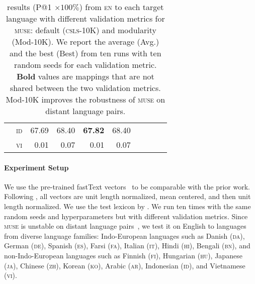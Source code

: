 \begin{table}[!tb]
\begin{tabular}{llrrrrrrrr}
                                 & \textsc{id} &  67.69          & 68.40                    & \bf 67.82    & 68.40     \\
                                 & \textsc{vi} &  0.01           & 0.07                     & 0.01         & 0.07      \\ \hline
     \end{tabular}
    \caption{\label{tab:validation_metric}  results (P@1
      $\times 100\%$) from \textsc{en} to each target language with
      different validation metrics for \textsc{muse}: default
      (\textsc{csls}-10K) and modularity (Mod-10K).  We report the
      average (Avg.) and the best (Best) from ten runs with ten random
      seeds for each validation metric.  \textbf{Bold} values are
      mappings that are not shared between the two validation metrics.
      Mod-10K improves the robustness of \textsc{muse} on distant
      language pairs.
      }
\end{table}



\paragraph{Experiment Setup}

We use the pre-trained
fastText vectors~\citep{fasttext} to be comparable with the prior
work.  Following \citet{self_learn}, all vectors are unit length
normalized, mean centered, and then unit length
normalized.
We use the test lexicon by \citet{lample2018word}.
We run ten times with the same random seeds and
hyperparameters but with different validation metrics.  Since
\textsc{muse} is unstable on distant language
pairs~\cite{self_learn,eigenval_sim,non_adv}, we test it on
English to languages from diverse language families: Indo-European
languages such as Danish (\textsc{da}), German (\textsc{de}), Spanish
(\textsc{es}), Farsi (\textsc{fa}), Italian (\textsc{it}), Hindi
(\textsc{hi}), Bengali (\textsc{bn}), and non-Indo-European languages
such as Finnish (\textsc{fi}), Hungarian (\textsc{hu}), Japanese
(\textsc{ja}), Chinese (\textsc{zh}), Korean (\textsc{ko}), Arabic
(\textsc{ar}), Indonesian (\textsc{id}), and Vietnamese (\textsc{vi}).


